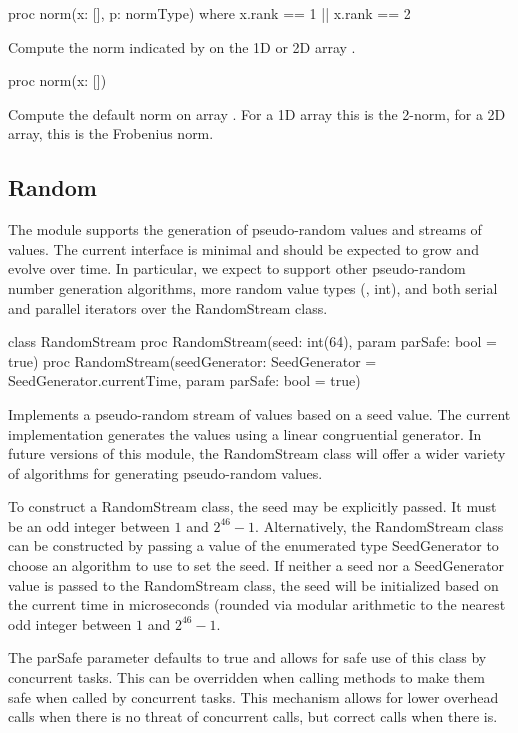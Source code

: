 \begin{protohead}
proc norm(x: [], p: normType) where x.rank == 1 || x.rank == 2
\end{protohead}
\begin{protobody}
Compute the norm indicated by  on the 1D or 2D array .
\end{protobody}

\begin{protohead}
proc norm(x: [])
\end{protohead}
\begin{protobody}
Compute the default norm on array .  For a 1D array this is
the 2-norm, for a 2D array, this is the Frobenius norm.
\end{protobody}

\subsection{Random}
\label{Random}

The module  supports the generation of pseudo-random
values and streams of values.  The current interface is minimal and
should be expected to grow and evolve over time.  In particular, we
expect to support other pseudo-random number generation algorithms,
more random value types (\eg, int), and both serial and parallel
iterators over the RandomStream class.

\begin{protohead}
class RandomStream
proc RandomStream(seed: int(64), param parSafe: bool = true)
proc RandomStream(seedGenerator: SeedGenerator = SeedGenerator.currentTime,
                 param parSafe: bool = true)
\end{protohead}
\begin{protobody}
Implements a pseudo-random stream of values based on a seed value.
The current implementation generates the values using a linear
congruential generator.  In future versions of this module, the
RandomStream class will offer a wider variety of algorithms for
generating pseudo-random values.

To construct a RandomStream class, the seed may be explicitly passed.
It must be an odd integer between $1$ and $2^{46}-1$.  Alternatively,
the RandomStream class can be constructed by passing a value of the
enumerated type SeedGenerator to choose an algorithm to use to set the
seed.  If neither a seed nor a SeedGenerator value is passed to the
RandomStream class, the seed will be initialized based on the current
time in microseconds (rounded via modular arithmetic to the nearest
odd integer between $1$ and $2^{46}-1$.

The parSafe parameter defaults to true and allows for safe use of this
class by concurrent tasks.  This can be overridden when calling
methods to make them safe when called by concurrent tasks.  This
mechanism allows for lower overhead calls when there is no threat of
concurrent calls, but correct calls when there is.
\end{protobody}

